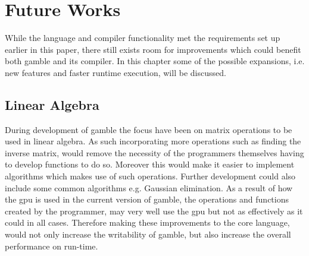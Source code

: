 \chapter{Future Works}\label{cha:future_works}
While the language and compiler functionality met the requirements set up earlier in this paper, there still exists room for improvements which could benefit both \gls{gamble} and its compiler.
In this chapter some of the possible expansions, i.e. new features and faster runtime execution, will be discussed.

\section{Linear Algebra}\label{improve:LIAL}
During development of \gls{gamble} the focus have been on matrix operations to be used in linear algebra.
As such incorporating more operations such as finding the inverse matrix, would remove the necessity of the programmers themselves having to develop functions to do so.
Moreover this would make it easier to implement algorithms which makes use of such operations.
Further development could also include some common algorithms e.g. Gaussian elimination.
As a result of how the \acrshort{gpu} is used in the current version of \gls{gamble}, the operations and functions created by the programmer, may very well use the \acrshort{gpu} but not as effectively as it could in all cases.
Therefore making these improvements to the core language, would not only increase the writability of \gls{gamble}, but also increase the overall performance on run-time.

